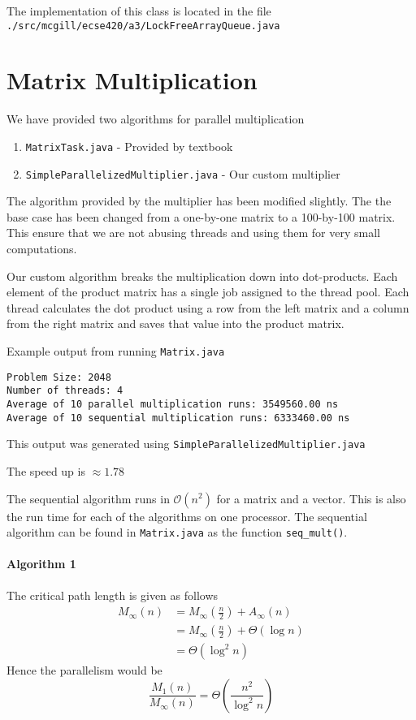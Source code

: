 \documentclass[12pt,letterpaper,titlepage]{article}
\begin{document}
      The implementation of this class is located in the file \\ \texttt{./src/mcgill/ecse420/a3/LockFreeArrayQueue.java}
    
  \section{Matrix Multiplication}
      We have provided two algorithms for parallel multiplication
      \begin{enumerate}
        \itemsep 0em
        \item \texttt{MatrixTask.java} - Provided by textbook
        \item \texttt{SimpleParallelizedMultiplier.java} - Our custom multiplier
      \end{enumerate}
    
      The algorithm provided by the multiplier has been modified slightly. The the base case has been changed from a one-by-one matrix to a 100-by-100 matrix. This ensure that we are not abusing threads and using them for very small computations.
      
      Our custom algorithm breaks the multiplication down into dot-products. Each element of the product matrix has a single job assigned to the thread pool. Each thread calculates the dot product using a row from the left matrix and a column from the right matrix and saves that value into the product matrix.
      
      Example output from running \texttt{Matrix.java}
      \begin{verbatim}
Problem Size: 2048
Number of threads: 4
Average of 10 parallel multiplication runs: 3549560.00 ns
Average of 10 sequential multiplication runs: 6333460.00 ns
      \end{verbatim}
      This output was generated using \texttt{SimpleParallelizedMultiplier.java}
      
      The speed up is $\approx 1.78 $
      
      The sequential algorithm runs in $\mathcal{O}(n^2)$ for a matrix and a vector. This is also the run time for each of the algorithms on one processor. The sequential algorithm can be found in \texttt{Matrix.java} as the function \texttt{seq\_mult()}.
      
      \paragraph{Algorithm 1} The critical path length is given as follows
      \begin{align*}
        M_\infty(n) &= M_\infty(\frac{n}{2}) + A_\infty(n) \\
        &= M_\infty(\frac{n}{2}) + \Theta(\log n) \\
        &= \Theta(\log^2 n)
      \end{align*}
      Hence the parallelism would be
      \begin{equation*}
        \frac{M_1(n)}{M_\infty(n)} = \Theta \left( \frac{n^2}{\log^2 n} \right)
      \end{equation*}
      
\end{document}
